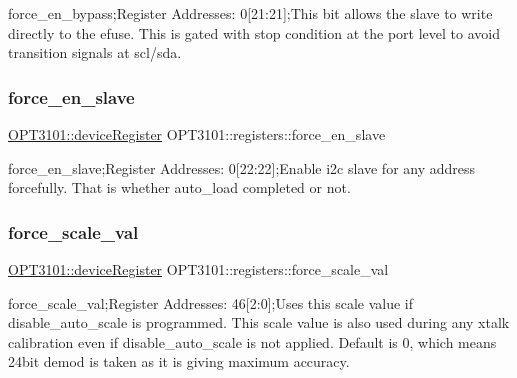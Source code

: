 force\+\_\+en\+\_\+bypass;Register Addresses\+: 0\mbox{[}21\+:21\mbox{]};This bit allows the slave to write directly to the efuse. This is gated with stop condition at the port level to avoid transition signals at scl/sda. 

\mbox{\label{class_o_p_t3101_1_1registers_a41a1c843f871b218c7ead6c8b4a4aca6}} 
\subsubsection{\texorpdfstring{force\+\_\+en\+\_\+slave}{force\_en\_slave}}
{\footnotesize\ttfamily \mbox{\hyperlink{class_o_p_t3101_1_1device_register}{O\+P\+T3101\+::device\+Register}} O\+P\+T3101\+::registers\+::force\+\_\+en\+\_\+slave}



force\+\_\+en\+\_\+slave;Register Addresses\+: 0\mbox{[}22\+:22\mbox{]};Enable i2c slave for any address forcefully. That is whether auto\+\_\+load completed or not. 

\mbox{\label{class_o_p_t3101_1_1registers_afe99c7a5fffb295c9922f8c28ab99a96}} 
\subsubsection{\texorpdfstring{force\+\_\+scale\+\_\+val}{force\_scale\_val}}
{\footnotesize\ttfamily \mbox{\hyperlink{class_o_p_t3101_1_1device_register}{O\+P\+T3101\+::device\+Register}} O\+P\+T3101\+::registers\+::force\+\_\+scale\+\_\+val}



force\+\_\+scale\+\_\+val;Register Addresses\+: 46\mbox{[}2\+:0\mbox{]};Uses this scale value if disable\+\_\+auto\+\_\+scale is programmed. This scale value is also used during any xtalk calibration even if disable\+\_\+auto\+\_\+scale is not applied. Default is \textquotesingle{}0\textquotesingle{}, which means 24bit demod is taken as it is giving maximum accuracy. 


